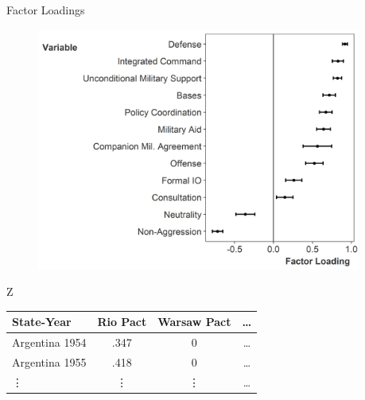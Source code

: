 \documentclass[12pt]{beamer}
\begin{document}
\begin{frame}{Factor Loadings}


\begin{figure}
	\centering
		\includegraphics[width=0.95\textwidth]{factor-loadings.png}
\end{figure}


\end{frame}



\begin{frame}[standout]{Z} 

\begin{tabular}{lccc}
State-Year & Rio Pact & Warsaw Pact & \ldots \\
\hline
Argentina 1954 & .347 & 0 & \ldots \\
Argentina 1955 & .418  & 0 & \ldots  \\
 \vdots & \vdots & \vdots & \ldots  
\end{tabular}

 \end{frame}



\end{document}
